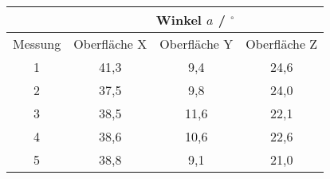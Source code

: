 \begin{tabular}{c|c|c|c}
    \space & \multicolumn{3}{c}{Winkel $a$ / $^\circ$} \\ \hline
    Messung & Oberfläche X & Oberfläche Y & Oberfläche Z \\
    1 & 41,3 & 9,4 & 24,6  \\
    2 & 37,5 & 9,8 & 24,0  \\
    3 & 38,5 & 11,6 & 22,1 \\
    4 & 38,6 & 10,6 & 22,6 \\
    5 & 38,8 & 9,1 & 21,0
\end{tabular}